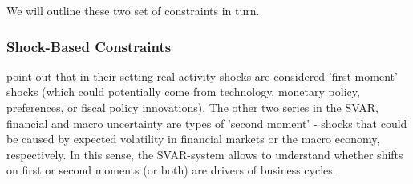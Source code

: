 \documentclass[a4paper,11pt,listof=nochaptergap,oneside,pointednumbers,bibtotoc,bigheadings,liststotoc,hidelinks]{scrbook}
\theoremstyle{mysatz}
\theoremstyle{mydefinition}
\theoremstyle{mytheorem}
\theoremstyle{mybemerkung}
\begin{document}
We will outline these two set of constraints in turn.

\subsubsection{Shock-Based Constraints}
\citet{ludvigsonetal:18,ludvigsonetal:19} point out that in their setting real activity shocks are considered 'first moment' shocks (which could potentially come from technology, monetary policy, preferences, or fiscal policy innovations). The other two series in the SVAR, financial and macro uncertainty are types of 'second moment' - shocks that could be caused by expected volatility in financial markets or the macro economy, respectively. In this sense, the SVAR-system allows to understand whether shifts on first or second moments (or both) are drivers of business cycles.
\end{document}
